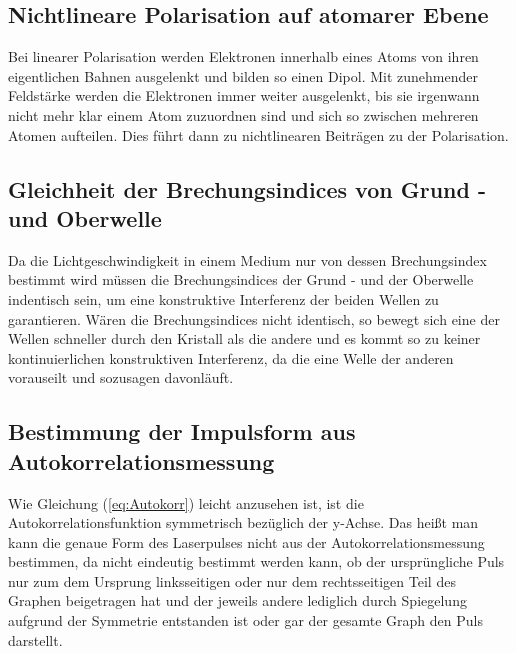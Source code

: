 \subsection{Nichtlineare Polarisation auf atomarer Ebene}
Bei linearer Polarisation werden Elektronen innerhalb eines Atoms von ihren eigentlichen Bahnen ausgelenkt und bilden so einen Dipol. Mit zunehmender Feldstärke werden die Elektronen immer weiter ausgelenkt, bis sie irgenwann nicht mehr klar einem Atom zuzuordnen sind und sich so zwischen mehreren Atomen aufteilen. Dies führt dann zu nichtlinearen Beiträgen zu der Polarisation.
\subsection{Gleichheit der Brechungsindices von Grund - und Oberwelle}
Da die Lichtgeschwindigkeit in einem Medium nur von dessen Brechungsindex bestimmt wird müssen die Brechungsindices der Grund - und der Oberwelle indentisch sein, um eine konstruktive Interferenz der beiden Wellen zu garantieren. Wären die Brechungsindices nicht identisch, so bewegt sich eine der Wellen schneller durch den Kristall als die andere und es kommt so zu keiner kontinuierlichen konstruktiven Interferenz, da die eine Welle der anderen vorauseilt und sozusagen davonläuft. 
\subsection{Bestimmung der Impulsform aus Autokorrelationsmessung}
Wie Gleichung (\ref{eq:Autokorr}) leicht anzusehen ist, ist die Autokorrelationsfunktion symmetrisch bezüglich der y-Achse. Das heißt man kann die genaue Form des Laserpulses nicht aus der Autokorrelationsmessung bestimmen, da nicht eindeutig bestimmt werden kann, ob der ursprüngliche Puls nur zum dem Ursprung linksseitigen oder nur dem rechtsseitigen Teil des Graphen beigetragen hat und der jeweils andere lediglich durch Spiegelung aufgrund der Symmetrie entstanden ist oder gar der gesamte Graph den Puls darstellt.

